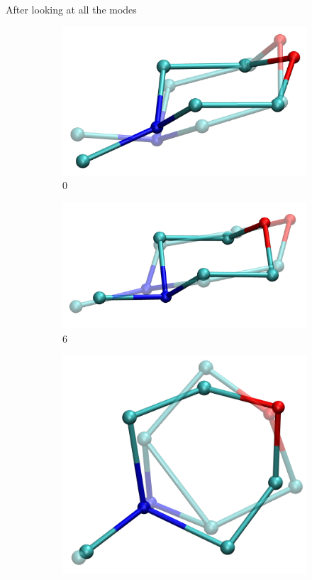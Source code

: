 \documentclass{beamer}
\begin{document}
\newcommand{\widthx}{0.1}
\begin{frame}{After looking at all the modes}
		\begin{figure}
			\centering
			\begin{subfigure}{\widthx\textwidth}
				\includegraphics[width=\textwidth]{mode0_ot.png}
				\caption{0}
			\end{subfigure}			
			\begin{subfigure}{\widthx\textwidth}
				\includegraphics[width=\textwidth]{mode6_ot.png}
				\caption{6}
			\end{subfigure}
			\begin{subfigure}{\widthx\textwidth}
				\includegraphics[width=\textwidth]{mode14_ot.png}

\end{subfigure}
\end{figure}
\end{frame}
\end{document}
